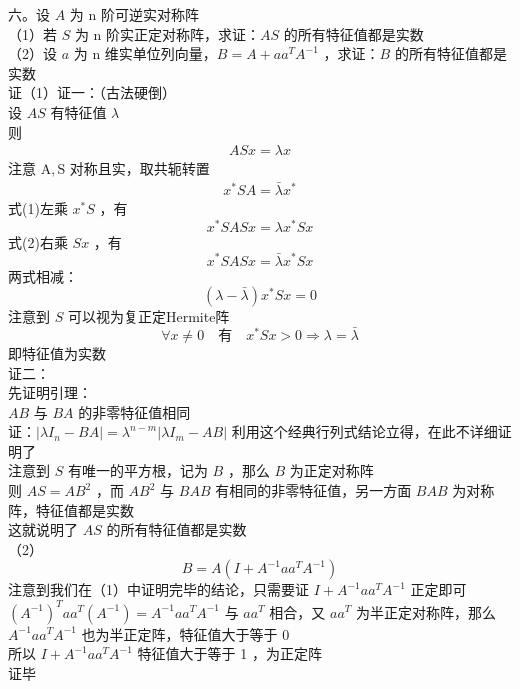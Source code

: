 \documentclass[UTF8]{ctexart}
\begin{document}
\noindent 六。设 $A$ 为 n 阶可逆实对称阵\\
（1）若 $S$ 为 n 阶实正定对称阵，求证：$A S$ 的所有特征值都是实数\\
（2）设 $a$ 为 n 维实单位列向量，$B=A+a a^{T} A^{-1}$ ，求证：$B$ 的所有特征值都是实数\\
证（1）证一：（古法硬倒）\\
设 $A S$ 有特征值 $\lambda$\\
则 
\begin{gather}
	A S x=\lambda x
\end{gather}
注意 $\mathrm{A}, \mathrm{S}$ 对称且实，取共轭转置
\begin{gather}
	x^{*} S A=\bar{\lambda} x^{*}
\end{gather} 
式(1)左乘 $x^{*} S$ ，有 
$$x^{*} S A S x=\lambda x^{*} S x$$
式(2)右乘 $S x$ ，有 
$$x^{*} S A S x=\bar{\lambda} x^{*} S x$$
两式相减：
$$(\lambda-\bar{\lambda}) x^{*} S x=0$$
注意到 $S$ 可以视为复正定Hermite阵\\
$$\forall x \neq 0\quad \text{有}\quad x^{*} S x>0 \Rightarrow \lambda=\bar{\lambda}$$ 
即特征值为实数\\
证二：\\
先证明引理：\\
$A B$ 与 $B A$ 的非零特征值相同\\
证：$\left|\lambda I_{n}-B A\right|=\lambda^{n-m}\left|\lambda I_{m}-A B\right|$ 利用这个经典行列式结论立得，在此不详细证明了\\
注意到 $S$ 有唯一的平方根，记为 $B$ ，那么 $B$ 为正定对称阵\\
则 $A S=A B^{2}$ ，而 $A B^{2}$ 与 $B A B$ 有相同的非零特征值，另一方面 $B A B$ 为对称阵，特征值都是实数\\
这就说明了 $A S$ 的所有特征值都是实数\\
（2）
$$B=A\left(I+A^{-1} a a^{T} A^{-1}\right)$$
注意到我们在（1）中证明完毕的结论，只需要证 $I+A^{-1} a a^{T} A^{-1}$ 正定即可\\
$\left(A^{-1}\right)^{T} a a^{T}\left(A^{-1}\right)=A^{-1} a a^{T} A^{-1}$ 与 $a a^{T}$ 相合，又 $a a^{T}$ 为半正定对称阵，那么 $A^{-1} a a^{T} A^{-1}$ 也为半正定阵，特征值大于等于 0\\
所以 $I+A^{-1} a a^{T} A^{-1}$ 特征值大于等于 1 ，为正定阵\\
证毕
	
\end{document}
